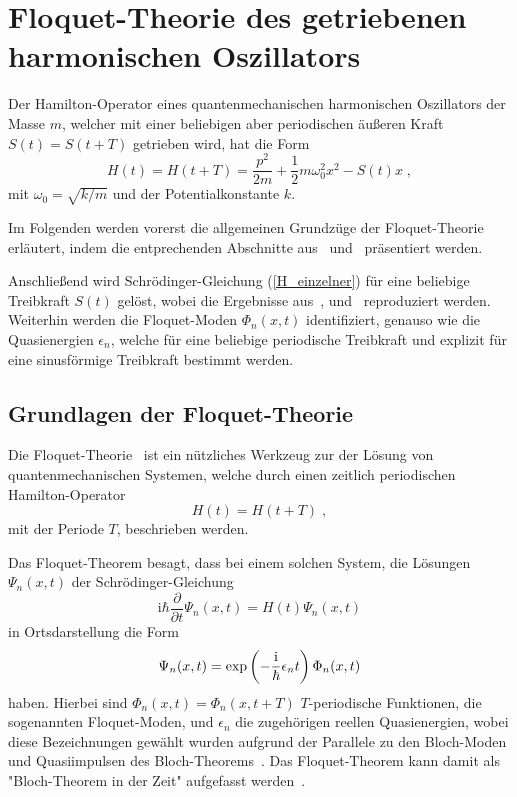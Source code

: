 \chapter{Floquet-Theorie des getriebenen harmonischen Oszillators}
\label{2}
Der Hamilton-Operator eines quantenmechanischen harmonischen Oszillators der Masse $m$, welcher mit einer beliebigen aber periodischen äußeren Kraft $S(t)=S(t+T)$ getrieben wird, hat die Form
\begin{equation}
  H(t) = H(t+T) = \frac{p^2}{2m} + \frac{1}{2}m\omega_0^2x^2-S(t)x \; ,
  \label{H_einzelner}
\end{equation}
mit $\omega_0=\sqrt{k/m}$ und der Potentialkonstante $k$.

Im Folgenden werden vorerst die allgemeinen Grundzüge der Floquet-Theorie erläutert, indem die entprechenden Abschnitte aus~\cite{haengi} und~\cite{sherly} präsentiert werden.

Anschließend wird Schrödinger-Gleichung (\ref{H_einzelner}) für eine beliebige Treibkraft $S(t)$ gelöst, wobei die Ergebnisse aus~\cite{haengi},\cite{husimi} und~\cite{mads} reproduziert werden.
Weiterhin werden die Floquet-Moden $\Phi_n(x,t)$ identifiziert, genauso wie die Quasienergien $\epsilon_n$, welche für eine beliebige periodische Treibkraft und explizit für eine sinusförmige Treibkraft bestimmt werden.
\iffalse
Danach werden wir die Ewartungswerte $\braket{x}_n,\braket{x^2}_n,\braket{p}_n,\braket{p^2}_n$ und damit die Unschärfe berechnen, indem wir die bekannten Erwartungswerte des ungetriebenen Oszillators benutzen.
Ebenso werden wir den zeitabhängigen und gemittelten Erwartungswert der Energie $\braket{H}_n$ und $\overline{H}_n$ berechnen.
\fi

\section{Grundlagen der Floquet-Theorie}
  Die Floquet-Theorie~\cite{haengi} ist ein nützliches Werkzeug zur der Lösung von quantenmechanischen Systemen, welche durch einen zeitlich periodischen Hamilton-Operator
  \begin{equation}
    H(t) = H(t+T) \; ,
  \end{equation}
  mit der Periode $T$, beschrieben werden.

  Das Floquet-Theorem besagt, dass bei einem solchen System, die Lösungen $\Psi_n(x,t)$ der Schrödinger-Gleichung
  \begin{equation}
    \text{i}\hbar\frac{\partial}{\partial t}\Psi_n(x,t) = H(t)\Psi_n(x,t)
    \label{schroedinger}
  \end{equation}
  in Ortsdarstellung die Form
  \begin{equation}
    \Psi_n(x,t) = \exp\left(-\frac{\text i}{\hbar}\epsilon_nt\right)\Phi_n(x,t)
    \label{floquet_theorem}
  \end{equation}
  haben.
  Hierbei sind $\Phi_n(x,t) = \Phi_n(x,t+T)$ $T$-periodische Funktionen, die sogenannten Floquet-Moden, und $\epsilon_n$ die zugehörigen reellen Quasienergien, wobei diese Bezeichnungen gewählt wurden aufgrund der Parallele zu den Bloch-Moden und Quasiimpulsen des Bloch-Theorems~\cite{haengi}.
  Das Floquet-Theorem kann damit als "Bloch-Theorem in der Zeit" aufgefasst werden~\cite{sherly}.

